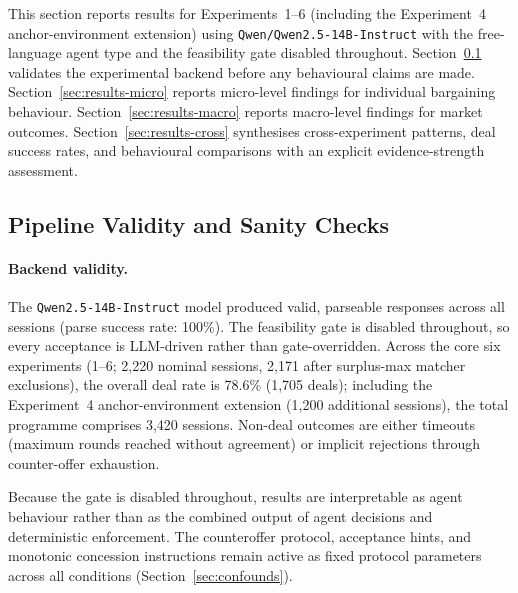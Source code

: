 
\label{sec:results}

This section reports results for Experiments~1--6 (including the Experiment~4 anchor-environment extension) using \texttt{Qwen/Qwen2.5-14B-Instruct} with the free-language agent type and the feasibility gate disabled throughout.  Section~\ref{sec:results-quality} validates the experimental backend before any behavioural claims are made.  Section~\ref{sec:results-micro} reports micro-level findings for individual bargaining behaviour.  Section~\ref{sec:results-macro} reports macro-level findings for market outcomes.  Section~\ref{sec:results-cross} synthesises cross-experiment patterns, deal success rates, and behavioural comparisons with an explicit evidence-strength assessment.


\subsection{Pipeline Validity and Sanity Checks}
\label{sec:results-quality}

\paragraph{Backend validity.}
The \texttt{Qwen2.5-14B-Instruct} model produced valid, parseable responses across all sessions (parse success rate: 100\%).  The feasibility gate is disabled throughout, so every acceptance is LLM-driven rather than gate-overridden.  Across the core six experiments (1--6; 2,220 nominal sessions, 2,171 after surplus-max matcher exclusions), the overall deal rate is 78.6\% (1,705 deals); including the Experiment~4 anchor-environment extension (1,200 additional sessions), the total programme comprises 3,420 sessions.  Non-deal outcomes are either timeouts (maximum rounds reached without agreement) or implicit rejections through counter-offer exhaustion.

Because the gate is disabled throughout, results are interpretable as agent behaviour rather than as the combined output of agent decisions and deterministic enforcement.  The counteroffer protocol, acceptance hints, and monotonic concession instructions remain active as fixed protocol parameters across all conditions (Section~\ref{sec:confounds}).

